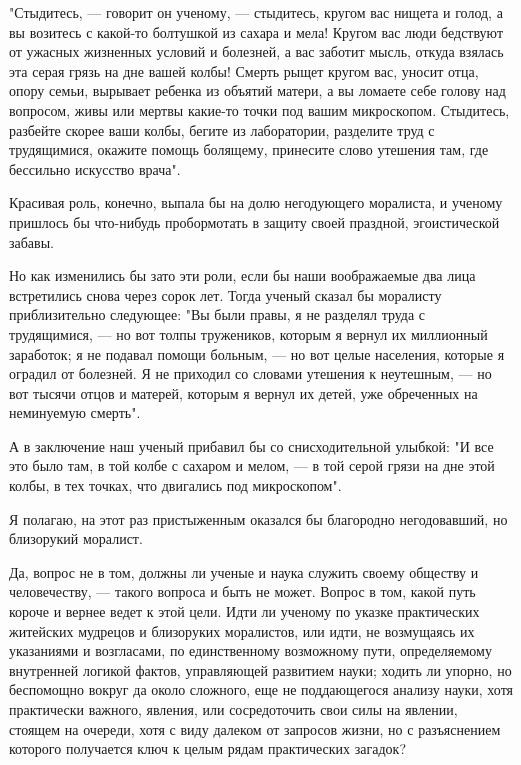 "Стыдитесь, --- говорит он ученому, --- стыдитесь, кругом вас нищета и
голод, а вы возитесь с какой-то болтушкой из сахара и мела! Кругом вас
люди бедствуют от ужасных жизненных  условий и болезней, а вас заботит
мысль, откуда взялась эта серая грязь на дне вашей колбы! Смерть рыщет
кругом  вас, уносит  отца, опору  семьи, вырывает  ребенка из  объятий
матери,  а  вы ломаете  себе  голову  над  вопросом, живы  или  мертвы
какие-то точки под вашим  микроскопом. Стыдитесь, разбейте скорее ваши
колбы, бегите  из лаборатории,  разделите труд с  трудящимися, окажите
помощь болящему, принесите слово утешения там, где бессильно искусство
врача".

Красивая роль,  конечно, выпала  бы на  долю негодующего  моралиста, и
ученому пришлось  бы что-нибудь пробормотать в  защиту своей праздной,
эгоистической забавы.

Но как изменились бы зато эти роли, если бы наши воображаемые два лица
встретились снова  через сорок лет.  Тогда ученый сказал  бы моралисту
приблизительно  следующее:  "Вы были  правы,  я  не разделял  труда  с
трудящимися,  ---  но  вот  толпы  тружеников,  которым  я  вернул  их
миллионный заработок;  я не подавал  помощи больным, --- но  вот целые
населения, которые  я оградил  от болезней. Я  не приходил  со словами
утешения к  неутешным, --- но  вот тысячи  отцов и матерей,  которым я
вернул их детей, уже обреченных на неминуемую смерть".

А в заключение  наш ученый прибавил бы со  снисходительной улыбкой: "И
все это было там, в той колбе с сахаром и мелом, --- в той серой грязи
на дне этой колбы, в тех точках, что двигались под микроскопом".

Я   полагаю,  на   этот  раз   пристыженным  оказался   бы  благородно
негодовавший, но близорукий моралист.

Да, вопрос не в том, должны  ли ученые и наука служить своему обществу
и человечеству,  --- такого  вопроса и  быть не  может. Вопрос  в том,
какой  путь короче  и вернее  ведет к  этой цели.  Идти ли  ученому по
указке практических  житейских мудрецов  и близоруких  моралистов, или
идти,  не  возмущаясь их  указаниями  и  возгласами, по  единственному
возможному пути, определяемому  внутренней логикой фактов, управляющей
развитием  науки; ходить  ли  упорно, но  беспомощно  вокруг да  около
сложного, еще не поддающегося анализу науки, хотя практически важного,
явления, или сосредоточить  свои силы на явлении,  стоящем на очереди,
хотя  с виду  далеком от  запросов жизни,  но с  разъяснением которого
получается ключ к целым рядам практических загадок?

